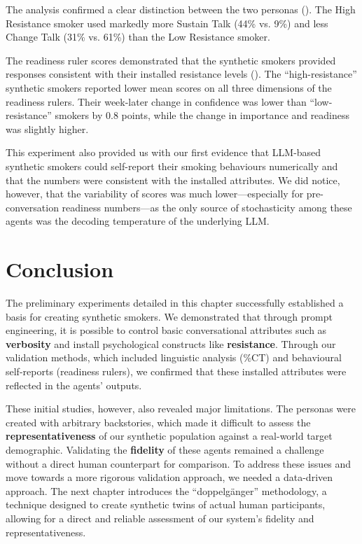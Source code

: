 The analysis confirmed a clear distinction between the two personas (). The High Resistance smoker used markedly more Sustain Talk (44\% vs. 9\%) and less Change Talk (31\% vs. 61\%) than the Low Resistance smoker.


The readiness ruler scores demonstrated that the synthetic smokers provided responses consistent with their installed resistance levels (). The ``high-resistance'' synthetic smokers reported lower mean scores on all three dimensions of the readiness rulers. Their week-later change in confidence was lower than ``low-resistance'' smokers by 0.8 points, while the change in importance and readiness was slightly higher.




This experiment also provided us with our first evidence that LLM-based synthetic smokers could self-report their smoking behaviours numerically and that the numbers were consistent with the installed attributes. We did notice, however, that the variability of scores was much lower---especially for pre-conversation readiness numbers---as the only source of stochasticity among these agents was the decoding temperature of the underlying LLM.



\section{Conclusion}
\label{sec:prelim-conclusion}

The preliminary experiments detailed in this chapter successfully established a basis for creating synthetic smokers. We demonstrated that through prompt engineering, it is possible to control basic conversational attributes such as \textbf{verbosity} and install psychological constructs like \textbf{resistance}. Through our validation methods, which included linguistic analysis (\%CT) and behavioural self-reports (readiness rulers), we confirmed that these installed attributes were reflected in the agents' outputs.

These initial studies, however, also revealed major limitations. The personas were created with arbitrary backstories, which made it difficult to assess the \textbf{representativeness} of our synthetic population against a real-world target demographic. Validating the \textbf{fidelity} of these agents remained a challenge without a direct human counterpart for comparison. To address these issues and move towards a more rigorous validation approach, we needed a data-driven approach. The next chapter introduces the ``doppelgänger'' methodology, a technique designed to create synthetic twins of actual human participants, allowing for a direct and reliable assessment of our system's fidelity and representativeness.